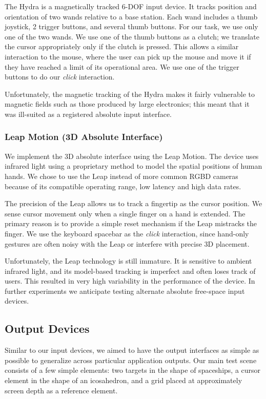 The Hydra is a magnetically tracked 6-DOF input device. It tracks position and
orientation of two wands relative to a base station. Each wand includes a thumb
joystick, 2 trigger buttons, and several thumb buttons. For our task, we use
only one of the two wands. We use one of the thumb buttons as a clutch; we
translate the cursor appropriately only if the clutch is pressed. This allows a
similar interaction to the mouse, where the user can pick up the mouse and move
it if they have reached a limit of its operational area. We use one of the
trigger buttons to do our {\it click} interaction.

Unfortunately, the magnetic tracking of the Hydra makes it fairly vulnerable to
magnetic fields such as those produced by large electronics; this meant that it
was ill-suited as a registered absolute input interface.

\subsubsection{Leap Motion (3D Absolute Interface)}
We implement the 3D absolute interface using the Leap Motion. The device uses
infrared light using a proprietary method to model the spatial positions of
human hands. We chose to use the Leap instead of more common
RGBD cameras because of its compatible operating range, low latency and high
data rates.

The precision of the Leap allows us to track a fingertip as the cursor
position.  We sense cursor movement only when a single finger on a hand is
extended. The primary reason is to provide a simple reset mechanism if the
Leap mistracks the finger. We use the keyboard spacebar as the {\it click}
interaction, since hand-only gestures are often noisy with the Leap or
interfere with precise 3D placement.

Unfortunately, the Leap technology is still immature. It is sensitive to
ambient infrared light, and its model-based tracking is imperfect and often
loses track of users. This resulted in very high variability in the
performance of the device. In further experiments we anticipate testing
alternate absolute free-space input devices.

\subsection{Output Devices}
Similar to our input devices, we aimed to have the output interfaces as simple
as possible to generalize across particular application outputs. Our main test
scene consists of a few simple elements: two targets in the shape of
spaceships, a cursor element in the shape of an icosahedron, and a grid placed
at approximately screen depth as a reference element.

